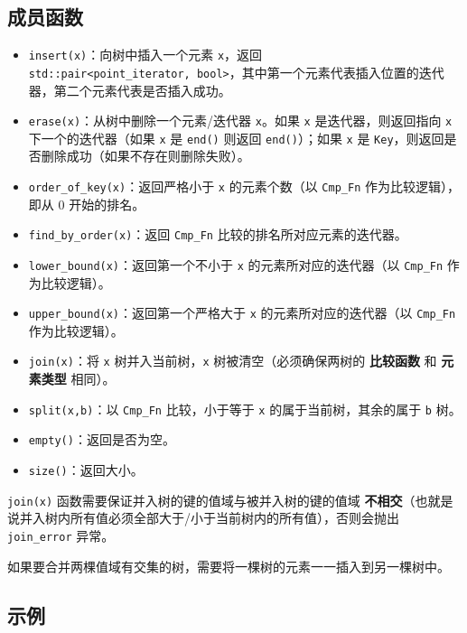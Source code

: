 \subsection{成员函数}\label{ux6210ux5458ux51fdux6570-6}

\begin{itemize}
\tightlist
\item
  \texttt{insert(x)}：向树中插入一个元素 \texttt{x}，返回 \texttt{std::pair\textless{}point\_iterator,\ bool\textgreater{}}，其中第一个元素代表插入位置的迭代器，第二个元素代表是否插入成功。
\item
  \texttt{erase(x)}：从树中删除一个元素/迭代器 \texttt{x}。如果 \texttt{x} 是迭代器，则返回指向 \texttt{x} 下一个的迭代器（如果 \texttt{x} 是 \texttt{end()} 则返回 \texttt{end()}）；如果 \texttt{x} 是 \texttt{Key}，则返回是否删除成功（如果不存在则删除失败）。
\item
  \texttt{order\_of\_key(x)}：返回严格小于 \texttt{x} 的元素个数（以 \texttt{Cmp\_Fn} 作为比较逻辑），即从 \(0\) 开始的排名。
\item
  \texttt{find\_by\_order(x)}：返回 \texttt{Cmp\_Fn} 比较的排名所对应元素的迭代器。
\item
  \texttt{lower\_bound(x)}：返回第一个不小于 \texttt{x} 的元素所对应的迭代器（以 \texttt{Cmp\_Fn} 作为比较逻辑）。
\item
  \texttt{upper\_bound(x)}：返回第一个严格大于 \texttt{x} 的元素所对应的迭代器（以 \texttt{Cmp\_Fn} 作为比较逻辑）。
\item
  \texttt{join(x)}：将 \texttt{x} 树并入当前树，\texttt{x} 树被清空（必须确保两树的 \textbf{比较函数} 和 \textbf{元素类型} 相同）。
\item
  \texttt{split(x,b)}：以 \texttt{Cmp\_Fn} 比较，小于等于 \texttt{x} 的属于当前树，其余的属于 \texttt{b} 树。
\item
  \texttt{empty()}：返回是否为空。
\item
  \texttt{size()}：返回大小。
\end{itemize}

\texttt{join(x)} 函数需要保证并入树的键的值域与被并入树的键的值域 \textbf{不相交}（也就是说并入树内所有值必须全部大于/小于当前树内的所有值），否则会抛出 \texttt{join\_error} 异常。

如果要合并两棵值域有交集的树，需要将一棵树的元素一一插入到另一棵树中。

\subsection{示例}\label{ux793aux4f8b-1}


